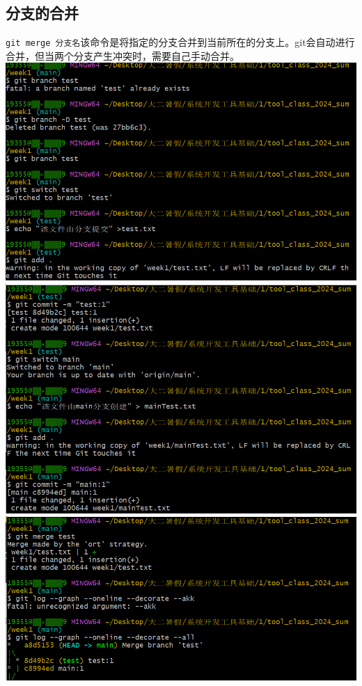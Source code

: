 \documentclass[UTF8,a4paper]{ctexart}
\begin{document}
\subsection{分支的合并}
\verb|git merge 分支名|\quad 该命令是将指定的分支合并到当前所在的分支上。git会自动进行合并，但当两个分支产生冲突时，需要自己手动合并。\\
\includegraphics[width=1\textwidth]{merge1.png}\\
\includegraphics[width=1\textwidth]{merge2.png}\\
\includegraphics[width=1\textwidth]{merge3.png}
\end{document}
